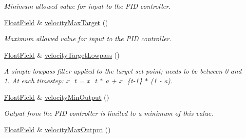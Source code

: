 \begin{DoxyCompactItemize}
\begin{DoxyCompactList}\small\item\em Minimum allowed value for input to the P\+ID controller. \end{DoxyCompactList}\item 
\hyperlink{classhebi_1_1Command_1_1FloatField}{Float\+Field} \& \hyperlink{classhebi_1_1Command_1_1Settings_1_1Actuator_1_1VelocityGains_a96dc827b032b71be332c02499e0d334d}{velocity\+Max\+Target} ()\hypertarget{classhebi_1_1Command_1_1Settings_1_1Actuator_1_1VelocityGains_a96dc827b032b71be332c02499e0d334d}{}\label{classhebi_1_1Command_1_1Settings_1_1Actuator_1_1VelocityGains_a96dc827b032b71be332c02499e0d334d}

\begin{DoxyCompactList}\small\item\em Maximum allowed value for input to the P\+ID controller. \end{DoxyCompactList}\item 
\hyperlink{classhebi_1_1Command_1_1FloatField}{Float\+Field} \& \hyperlink{classhebi_1_1Command_1_1Settings_1_1Actuator_1_1VelocityGains_a32c98ce7977d7e0751aa272691552dae}{velocity\+Target\+Lowpass} ()\hypertarget{classhebi_1_1Command_1_1Settings_1_1Actuator_1_1VelocityGains_a32c98ce7977d7e0751aa272691552dae}{}\label{classhebi_1_1Command_1_1Settings_1_1Actuator_1_1VelocityGains_a32c98ce7977d7e0751aa272691552dae}

\begin{DoxyCompactList}\small\item\em A simple lowpass filter applied to the target set point; needs to be between 0 and 1. At each timestep\+: x\+\_\+t = x\+\_\+t $\ast$ a + x\+\_\+\{t-\/1\} $\ast$ (1 -\/ a). \end{DoxyCompactList}\item 
\hyperlink{classhebi_1_1Command_1_1FloatField}{Float\+Field} \& \hyperlink{classhebi_1_1Command_1_1Settings_1_1Actuator_1_1VelocityGains_aebc8db25cd3cb2756415953cf0d0a507}{velocity\+Min\+Output} ()\hypertarget{classhebi_1_1Command_1_1Settings_1_1Actuator_1_1VelocityGains_aebc8db25cd3cb2756415953cf0d0a507}{}\label{classhebi_1_1Command_1_1Settings_1_1Actuator_1_1VelocityGains_aebc8db25cd3cb2756415953cf0d0a507}

\begin{DoxyCompactList}\small\item\em Output from the P\+ID controller is limited to a minimum of this value. \end{DoxyCompactList}\item 
\hyperlink{classhebi_1_1Command_1_1FloatField}{Float\+Field} \& \hyperlink{classhebi_1_1Command_1_1Settings_1_1Actuator_1_1VelocityGains_a98c49a0a9f30665f3853ba5fb40ab0e3}{velocity\+Max\+Output} ()\hypertarget{classhebi_1_1Command_1_1Settings_1_1Actuator_1_1VelocityGains_a98c49a0a9f30665f3853ba5fb40ab0e3}{}\label{classhebi_1_1Command_1_1Settings_1_1Actuator_1_1VelocityGains_a98c49a0a9f30665f3853ba5fb40ab0e3}


\end{DoxyCompactItemize}
